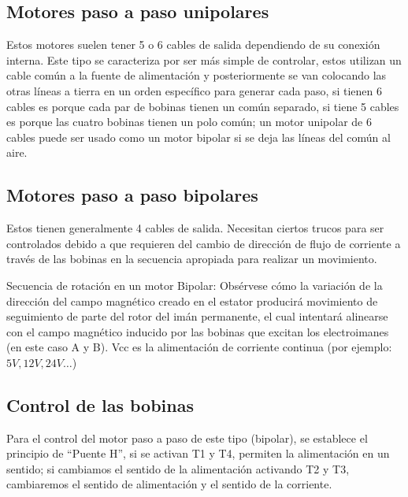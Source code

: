 \documentclass[../main]{subfiles}
\begin{document}
\subsection{Motores paso a paso unipolares}
Estos motores suelen tener 5 o 6 cables de salida dependiendo de su
conexión interna. Este tipo se caracteriza por ser más simple de
controlar, estos utilizan un cable común a la fuente de alimentación
y posteriormente se van colocando las otras líneas a tierra en un
orden específico para generar cada paso, si tienen 6 cables es porque
cada par de bobinas tienen un común separado, si tiene 5 cables es
porque las cuatro bobinas tienen un polo común; un motor unipolar de
6 cables puede ser usado como un motor bipolar si se deja las líneas
del común al aire.

\subsection{Motores paso a paso bipolares}
Estos tienen generalmente 4 cables de salida. Necesitan ciertos
trucos para ser controlados debido a que requieren del cambio de
dirección de flujo de corriente a través de las bobinas en la
secuencia apropiada para realizar un movimiento.

Secuencia de rotación en un motor Bipolar: Obsérvese cómo la
variación de la dirección del campo magnético creado en el estator
producirá movimiento de seguimiento de parte del rotor del imán
permanente, el cual intentará alinearse con el campo magnético
inducido por las bobinas que excitan los electroimanes (en este caso
A y B). Vcc es la alimentación de corriente continua (por ejemplo:
$5V, 12V, 24V \ldots$)

\subsection{Control de las bobinas}


Para el control del motor paso a paso de este tipo (bipolar), se
establece el principio de ``Puente H'', si se activan T1 y T4, permiten
la alimentación en un sentido; si cambiamos el sentido de la
alimentación activando T2 y T3, cambiaremos el sentido de
alimentación y el sentido de la corriente.
\end{document}
